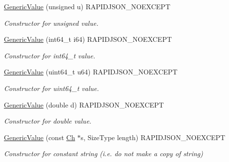 \begin{DoxyCompactItemize}
\hyperlink{classGenericValue_a972bff6c56ac3d04622ff7fad8d98331}{Generic\+Value} (unsigned u) R\+A\+P\+I\+D\+J\+S\+O\+N\+\_\+\+N\+O\+E\+X\+C\+E\+PT
\begin{DoxyCompactList}\small\item\em Constructor for unsigned value. \end{DoxyCompactList}\item 
\mbox{\label{classGenericValue_a964b69f1d2596f75ded5421b6db01a14}} 
\hyperlink{classGenericValue_a964b69f1d2596f75ded5421b6db01a14}{Generic\+Value} (int64\+\_\+t i64) R\+A\+P\+I\+D\+J\+S\+O\+N\+\_\+\+N\+O\+E\+X\+C\+E\+PT
\begin{DoxyCompactList}\small\item\em Constructor for int64\+\_\+t value. \end{DoxyCompactList}\item 
\mbox{\label{classGenericValue_ad04805a57f5050c8e04be469ba64d6f3}} 
\hyperlink{classGenericValue_ad04805a57f5050c8e04be469ba64d6f3}{Generic\+Value} (uint64\+\_\+t u64) R\+A\+P\+I\+D\+J\+S\+O\+N\+\_\+\+N\+O\+E\+X\+C\+E\+PT
\begin{DoxyCompactList}\small\item\em Constructor for uint64\+\_\+t value. \end{DoxyCompactList}\item 
\mbox{\label{classGenericValue_a267d05b7e98c3507908eaf085fe41155}} 
\hyperlink{classGenericValue_a267d05b7e98c3507908eaf085fe41155}{Generic\+Value} (double d) R\+A\+P\+I\+D\+J\+S\+O\+N\+\_\+\+N\+O\+E\+X\+C\+E\+PT
\begin{DoxyCompactList}\small\item\em Constructor for double value. \end{DoxyCompactList}\item 
\mbox{\label{classGenericValue_a4d9af98141360cd801daab4ed1ca2c91}} 
\hyperlink{classGenericValue_a4d9af98141360cd801daab4ed1ca2c91}{Generic\+Value} (const \hyperlink{classGenericValue_ade0e0ce64ccd5d852da57a35e720bafb}{Ch} $\ast$s, Size\+Type length) R\+A\+P\+I\+D\+J\+S\+O\+N\+\_\+\+N\+O\+E\+X\+C\+E\+PT
\begin{DoxyCompactList}\small\item\em Constructor for constant string (i.\+e. do not make a copy of string) \end{DoxyCompactList}\item 

\end{DoxyCompactItemize}
